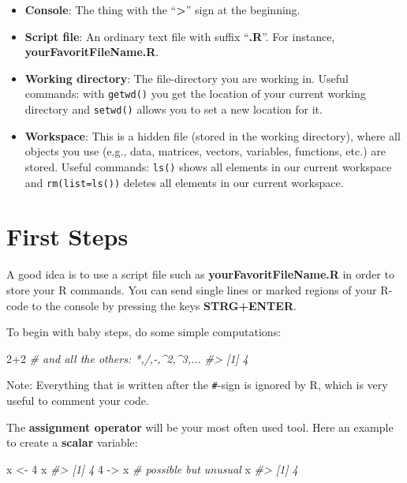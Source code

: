 \documentclass[
  14pt,
]{memoir}
\newenvironment{Shaded}{\begin{snugshade}}{\end{snugshade}}
\newcommand{\CommentTok}[1]{\textcolor[rgb]{0.56,0.35,0.01}{\textit{#1}}}
\newcommand{\DecValTok}[1]{\textcolor[rgb]{0.00,0.00,0.81}{#1}}
\newcommand{\NormalTok}[1]{#1}
\newcommand{\OtherTok}[1]{\textcolor[rgb]{0.56,0.35,0.01}{#1}}
\newcommand{\SpecialCharTok}[1]{\textcolor[rgb]{0.00,0.00,0.00}{#1}}
\providecommand{\tightlist}{%
  \setlength{\itemsep}{0pt}\setlength{\parskip}{0pt}}
\begin{document}
\begin{itemize}
\tightlist
\item
  \textbf{Console}: The thing with the ``\textbf{\textgreater{}}'' sign at the beginning.
\item
  \textbf{Script file}: An ordinary text file with suffix ``\textbf{.R}''. For instance, \textbf{yourFavoritFileName.R}.
\item
  \textbf{Working directory}: The file-directory you are working in. Useful commands: with \texttt{getwd()} you get the location of your current working directory and \texttt{setwd()} allows you to set a new location for it.
\item
  \textbf{Workspace}: This is a hidden file (stored in the working directory), where all objects you use (e.g., data, matrices, vectors, variables, functions, etc.) are stored. Useful commands: \texttt{ls()} shows all elements in our current workspace and \texttt{rm(list=ls())} deletes all elements in our current workspace.
\end{itemize}

\hypertarget{first-steps}{%
\section{First Steps}\label{first-steps}}

A good idea is to use a script file such as \textbf{yourFavoritFileName.R} in order to store your R commands. You can send single lines or marked regions of your R-code to the console by pressing the keys \textbf{STRG+ENTER}.

To begin with baby steps, do some simple computations:

\begin{Shaded}
\begin{Highlighting}[]
\DecValTok{2}\SpecialCharTok{+}\DecValTok{2} \CommentTok{\# and all the others: *,/,{-},\^{}2,\^{}3,... }
\CommentTok{\#\textgreater{} [1] 4}
\end{Highlighting}
\end{Shaded}

Note: Everything that is written after the \texttt{\#}-sign is ignored by R, which is very useful to comment your code.

The \textbf{assignment operator} will be your most often used tool. Here an example to create a \textbf{scalar} variable:

\begin{Shaded}
\begin{Highlighting}[]
\NormalTok{x }\OtherTok{\textless{}{-}} \DecValTok{4} 
\NormalTok{x}
\CommentTok{\#\textgreater{} [1] 4}
\DecValTok{4} \OtherTok{{-}\textgreater{}}\NormalTok{ x }\CommentTok{\# possible but unusual}
\NormalTok{x}
\CommentTok{\#\textgreater{} [1] 4}
\end{Highlighting}
\end{Shaded}
\end{document}
